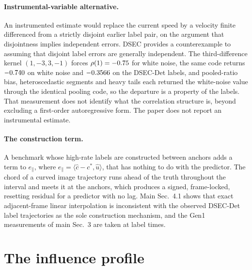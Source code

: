 \documentclass[10pt,twocolumn,letterpaper]{article}
\begin{document}
\paragraph{Instrumental-variable alternative.} An instrumented
estimate would replace the current speed by a velocity finite differenced from a
strictly disjoint earlier label pair, on the argument that disjointness implies
independent errors. DSEC provides a counterexample to assuming that disjoint
label errors are generally independent. The third-difference kernel $(1,-3,3,-1)$ forces
$\rho(1)=-0.75$ for white noise, the same code returns
$-0.740$ on white noise and $-0.3566$ on the DSEC-Det labels,
and pooled-ratio bias, heteroscedastic segments and heavy tails each returned the
white-noise value through the identical pooling code, so the departure is a
property of the labels. That measurement does not identify what the correlation
structure is, beyond excluding a first-order autoregressive form. The paper does
not report an instrumental estimate.

\paragraph{The construction term.} A benchmark whose high-rate labels are
constructed between anchors adds a term to $e_{\parallel}$, where
$e_{\parallel}=\langle\hat c-c^{*},\hat u\rangle$, that has nothing to do
with the predictor. The chord of a curved image trajectory runs ahead of the
truth throughout the interval and meets it at the anchors, which produces a
signed, frame-locked, resetting residual for a predictor with no lag. Main
Sec.~4.1 shows that exact adjacent-frame linear interpolation is inconsistent
with the observed DSEC-Det label trajectories as the sole construction mechanism,
and the Gen1 measurements of main Sec.~3 are taken at label times.

\section{The influence profile}
\label{sup:influence}
\end{document}
